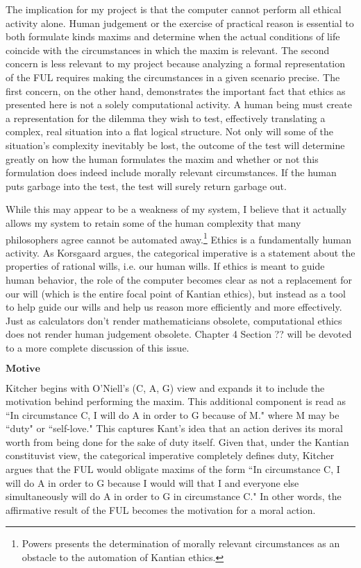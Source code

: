 \begin{isabellebody}
\begin{isamarkuptext}
The implication for my project is that the computer cannot perform all ethical activity alone. 
Human judgement or the exercise of practical reason is essential to both formulate kinds maxims and 
determine when the actual conditions of life coincide with the circumstances in which the maxim is relevant. 
The second concern is less relevant to my project because analyzing a formal representation of the FUL requires 
making the circumstances in a given scenario precise. The first concern, on the other hand, demonstrates 
the important fact that ethics as presented here is not a solely computational activity. A
human being must create a representation for the dilemma they wish to test, effectively translating 
a complex, real situation into a flat logical structure. Not only will some of the situation's complexity
inevitably be lost, the outcome of the test will determine greatly on how the human formulates the maxim
and whether or not this formulation does indeed include morally relevant circumstances. If the human puts 
garbage into the test, the test will surely return garbage out.

While this may appear to be a weakness of my system, I believe that it actually
allows my system to retain some of the human complexity that many philosophers agree cannot be automated away.\footnote{Powers \cite{powers} presents 
the determination of morally relevant circumstances as an obstacle to the automation of Kantian ethics.}
Ethics is a fundamentally human activity. As Korsgaard argues, the categorical imperative is a statement 
about the properties of rational wills, i.e. our human wills. If ethics is meant to guide human behavior, 
the role of the computer becomes clear as not a replacement for our will (which is the entire focal point 
of Kantian ethics), but instead as a tool to help guide our wills and help us reason more efficiently 
and more effectively. Just as calculators don't render mathematicians obsolete, computational ethics
does not render human judgement obsolete. Chapter 4 Section ??  will be devoted to a more complete discussion 
of this issue.

$\textbf{Motive}$

Kitcher \cite{whatisamaxim} begins with O'Niell's (C, A, G) view and expands it to include the motivation 
behind performing the maxim. This additional component is read 
as ``In circumstance C, I will do A in order to G because of M." where M may be ``duty" or ``self-love."
This captures Kant's idea that an action derives its moral worth from being done for the sake of duty itself.
Given that, under the Kantian constituvist view, the categorical
imperative completely defines duty, Kitcher argues that the FUL would obligate maxims of the form 
``In circumstance C, I will do A in order to G because I would will that I and everyone else simultaneously
will do A in order to G in circumstance C." In other words, the affirmative result of the FUL becomes 
the motivation for a moral action.


\end{isamarkuptext}
\end{isabellebody}
